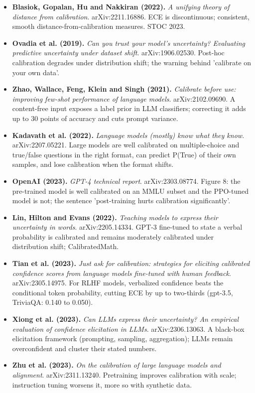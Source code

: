 \documentclass[11pt,letterpaper]{article}
\begin{document}
\begin{itemize}[leftmargin=1.2em,itemsep=3pt]
\item \textbf{Blasiok, Gopalan, Hu and Nakkiran (2022).} \textit{A unifying theory of distance from calibration}. arXiv:2211.16886. ECE is discontinuous; consistent, smooth distance-from-calibration measures. STOC 2023.
\item \textbf{Ovadia et al. (2019).} \textit{Can you trust your model's uncertainty? Evaluating predictive uncertainty under dataset shift}. arXiv:1906.02530. Post-hoc calibration degrades under distribution shift; the warning behind 'calibrate on your own data'.
\item \textbf{Zhao, Wallace, Feng, Klein and Singh (2021).} \textit{Calibrate before use: improving few-shot performance of language models}. arXiv:2102.09690. A content-free input exposes a label prior in LLM classifiers; correcting it adds up to 30 points of accuracy and cuts prompt variance.
\item \textbf{Kadavath et al. (2022).} \textit{Language models (mostly) know what they know}. arXiv:2207.05221. Large models are well calibrated on multiple-choice and true/false questions in the right format, can predict P(True) of their own samples, and lose calibration when the format shifts.
\item \textbf{OpenAI (2023).} \textit{GPT-4 technical report}. arXiv:2303.08774. Figure 8: the pre-trained model is well calibrated on an MMLU subset and the PPO-tuned model is not; the sentence 'post-training hurts calibration significantly'.
\item \textbf{Lin, Hilton and Evans (2022).} \textit{Teaching models to express their uncertainty in words}. arXiv:2205.14334. GPT-3 fine-tuned to state a verbal probability is calibrated and remains moderately calibrated under distribution shift; CalibratedMath.
\item \textbf{Tian et al. (2023).} \textit{Just ask for calibration: strategies for eliciting calibrated confidence scores from language models fine-tuned with human feedback}. arXiv:2305.14975. For RLHF models, verbalized confidence beats the conditional token probability, cutting ECE by up to two-thirds (gpt-3.5, TriviaQA: 0.140 to 0.050).
\item \textbf{Xiong et al. (2023).} \textit{Can LLMs express their uncertainty? An empirical evaluation of confidence elicitation in LLMs}. arXiv:2306.13063. A black-box elicitation framework (prompting, sampling, aggregation); LLMs remain overconfident and cluster their stated numbers.
\item \textbf{Zhu et al. (2023).} \textit{On the calibration of large language models and alignment}. arXiv:2311.13240. Pretraining improves calibration with scale; instruction tuning worsens it, more so with synthetic data.

\end{itemize}
\end{document}
